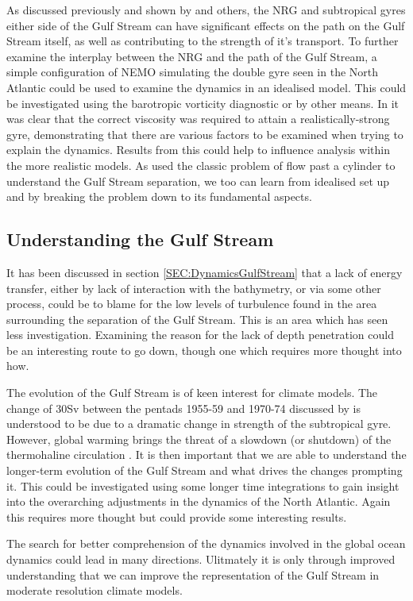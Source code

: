 \documentclass[..\EOYR.tex]{subfiles}
\begin{document}
As discussed previously and shown by \citep{Zhang2007} and others, the NRG and subtropical gyres either side of the Gulf Stream can have significant effects on the path on the Gulf Stream itself, as well as contributing to the strength of it's transport. 
To further examine the interplay between the NRG and the path of the Gulf Stream, a simple configuration of NEMO simulating the double gyre seen in the North Atlantic could be used to examine the dynamics in an idealised model. 
This could be investigated using the barotropic vorticity diagnostic or by other means. In \citep{Zhang2007} it was clear that the correct viscosity was required to attain a realistically-strong gyre, demonstrating that there are various factors to be examined when trying to explain the dynamics.
Results from this could help to influence analysis within the more realistic models. 
As \citep{Tansley2001} used the classic problem of flow past a cylinder to understand the Gulf Stream separation, we too can learn from idealised set up and by breaking the problem down to its fundamental aspects.

\subsection{Understanding the Gulf Stream}
\label{SSEC:UnderstandingGulfStream}
  
It has been discussed in section \ref{SEC:DynamicsGulfStream} that a lack of energy transfer, either by lack of interaction with the bathymetry, or via some other process, could be to blame for the low levels of turbulence found in the area surrounding the separation of the Gulf Stream. This is an area which has seen less investigation. Examining the reason for the lack of depth penetration could be an interesting route to go down, though one which requires more thought into how. %

The evolution of the Gulf Stream is of keen interest for climate models.
The change of 30Sv between the pentads 1955-59 and 1970-74 discussed by \citep{Greatbatch1991} is understood to be due to a dramatic change in strength of the subtropical gyre. 
However, global warming brings the threat of a slowdown (or shutdown) of the thermohaline circulation \citep{Gough1998}.
It is then important that we are able to understand the longer-term evolution of the Gulf Stream and what drives the changes prompting it. 
This could be investigated using some longer time integrations to gain insight into the overarching adjustments in the dynamics of the North Atlantic. Again this requires more thought but could provide some interesting results.




The search for better comprehension of the dynamics involved in the global ocean dynamics could lead in many directions.
Ulitmately it is only through improved understanding that we can improve the representation of the Gulf Stream in moderate resolution climate models. 
\end{document}
